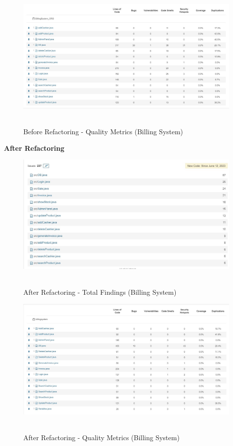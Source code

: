 \documentclass[12pt,letterpaper]{report}
\begin{document}
{\begin{figure}
    \centering
    \includegraphics[width=1.0\linewidth]{Images/Quality_metrics_before.jpeg}\
    \caption{Before Refactoring - Quality Metrics (Billing System)}
    \label{fig:enter-label}
\end{figure}

\textbf{After Refactoring}

\begin{figure}[h!]
    \centering
    \includegraphics[width=1.0\linewidth]{Images/Before_Refactoring.jpeg}\
    \caption{After Refactoring - Total Findings (Billing System)}
    \label{fig:enter-label}
\end{figure}

\begin{figure}
    \centering
    \includegraphics[width=1.0\linewidth]{Images/Quality_metrics_after.jpeg}\
    \caption{After Refactoring - Quality Metrics (Billing System)}
    \label{fig:enter-label}
\end{figure}

}
\end{document}
